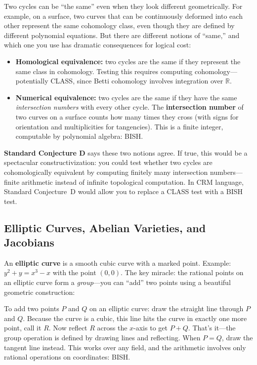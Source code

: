 \documentclass[11pt,twoside,openany]{report}
\theoremstyle{remark}
\newcommand{\BISH}{\textsf{BISH}}
\newcommand{\CLASS}{\textsf{CLASS}}
\begin{document}
Two cycles can be ``the same'' even when they look different geometrically. For example, on a surface, two curves that can be continuously deformed into each other represent the same cohomology class, even though they are defined by different polynomial equations. But there are different notions of ``same,'' and which one you use has dramatic consequences for logical cost:
\begin{itemize}
  \item \textbf{Homological equivalence:} two cycles are the same if they represent the same class in cohomology. Testing this requires computing cohomology---potentially \CLASS, since Betti cohomology involves integration over $\mathbb{R}$.
  \item \textbf{Numerical equivalence:} two cycles are the same if they have the same \emph{intersection numbers} with every other cycle. The \textbf{intersection number} of two curves on a surface counts how many times they cross (with signs for orientation and multiplicities for tangencies). This is a finite integer, computable by polynomial algebra: \BISH.
\end{itemize}

\textbf{Standard Conjecture D} says these two notions agree. If true, this would be a spectacular constructivization: you could test whether two cycles are cohomologically equivalent by computing finitely many intersection numbers---finite arithmetic instead of infinite topological computation. In CRM language, Standard Conjecture~D would allow you to replace a \CLASS{} test with a \BISH{} test.

\subsection*{Elliptic Curves, Abelian Varieties, and Jacobians}

An \textbf{elliptic curve} is a smooth cubic curve with a marked point. Example: $y^2 + y = x^3 - x$ with the point $(0,0)$. The key miracle: the rational points on an elliptic curve form a \emph{group}---you can ``add'' two points using a beautiful geometric construction:

\begin{analogybox}
To add two points $P$ and $Q$ on an elliptic curve: draw the straight line through $P$ and $Q$. Because the curve is a cubic, this line hits the curve in exactly one more point, call it $R$. Now reflect $R$ across the $x$-axis to get $P + Q$. That's it---the group operation is defined by drawing lines and reflecting. When $P = Q$, draw the tangent line instead. This works over any field, and the arithmetic involves only rational operations on coordinates: \BISH.
\end{analogybox}
\end{document}
